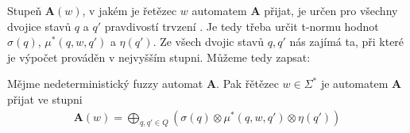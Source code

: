 Stupeň $\mathbf{A}(w)$, v jakém je řetězec $w$ automatem $\mathbf{A}$ přijat, je určen pro všechny dvojice stavů $q$ a $q'$ pravdivostí trvzení . Je tedy třeba určit t-normu hodnot $\sigma(q)$, $\mu^*(q, w, q')$ a $\eta(q')$. Ze všech dvojic stavů $q, q'$ nás zajímá ta, při které je výpočet prováděn v nejvyšším stupni. Můžeme tedy zapsat:

\begin{definition}\label{def-RetPriAut}
 Mějme nedeterministický fuzzy automat $\mathbf{A}$. Pak řětězec $w \in \Sigma^*$ je automatem $\mathbf{A}$ přijat ve stupni
 \begin{align} \label{eq-RetPriAut}
  \mathbf{A}(w) = \bigoplus_{q, q' \in Q} (\sigma(q) \otimes \mu^*(q, w, q') \otimes \eta(q'))
 \end{align}
\end{definition}

